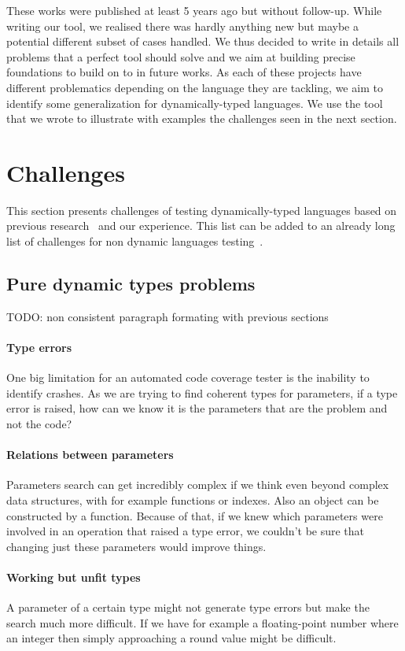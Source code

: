 \documentclass{llncs2e/llncs}
\makeatletter
\def\todo#1{{\color{red}TODO\@: #1}}
\makeatother
\begin{document}
These works were published at least 5 years ago but without follow-up. While
writing our tool, we realised there was hardly anything new but maybe a
potential different subset of cases handled. We thus decided to write in details
all problems that a perfect tool should solve and we aim at building precise
foundations to build on to in future works. As each of these projects have
different problematics depending on the language they are tackling, we aim to
identify some generalization for dynamically-typed languages. We use the tool
that we wrote to illustrate with examples the challenges seen in the next
section.


\section{Challenges}
\label{challenges}

This section presents challenges of testing dynamically-typed languages based on
previous research~\cite{ducasse2011challenges} and our experience. This list
can be added to an already long list of challenges for non dynamic languages
testing~\cite{mcminn2011search}.

\subsection{Pure dynamic types problems}
\todo{non consistent paragraph formating with previous sections}
\paragraph{Type errors} One big limitation for an automated code coverage tester
is the inability to identify crashes. As we are trying to find coherent types
for parameters, if a type error is raised, how can we know it is the parameters
that are the problem and not the code?

\paragraph{Relations between parameters} Parameters search can get incredibly
complex if we think even beyond complex data structures, with for example
functions or indexes. Also an object can be constructed by a function. Because
of that, if we knew which parameters were involved in an operation that raised a
type error, we couldn't be sure that changing just these parameters would
improve things.

\paragraph{Working but unfit types} A parameter of a certain type might not
generate type errors but make the search much more difficult. If we have for
example a floating-point number where an integer then simply approaching a round
value might be difficult.
\end{document}
